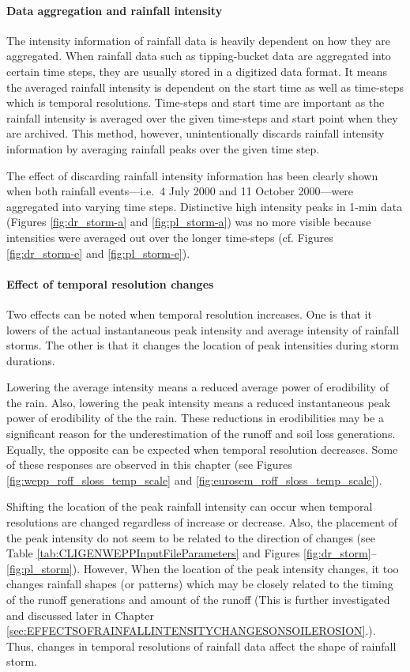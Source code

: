\paragraph{Data aggregation and rainfall intensity} The intensity information
of rainfall data is heavily dependent on how they are aggregated. When rainfall
data such as tipping-bucket data are aggregated into certain time steps, they
are usually stored in a digitized data format. It means the averaged rainfall
intensity is dependent on the start time as well as time-steps which is temporal
resolutions. Time-steps and start time are important as the rainfall intensity
is
averaged over the given time-steps and start point when they are archived. This
method, however, unintentionally discards rainfall intensity information by
averaging rainfall peaks over the given time step.

The effect of discarding rainfall intensity information has been clearly shown
when both rainfall events---i.e.\ 4 July 2000 and 11 October 2000---were
aggregated into varying time steps. Distinctive high intensity peaks in 1-min
data (Figures \ref{fig:dr_storm-a} and \ref{fig:pl_storm-a}) was no more visible
because intensities were averaged out over the longer time-steps (cf. Figures
\ref{fig:dr_storm-e} and \ref{fig:pl_storm-e}).

\paragraph{Effect of temporal resolution changes} Two effects can be noted when
temporal resolution increases. One is that it lowers of the actual instantaneous
peak
intensity and average intensity of rainfall storms. The other is that it
changes the location of peak intensities during storm durations.

Lowering the average intensity means a reduced average power of erodibility
of the rain. Also, lowering the peak intensity means a reduced instantaneous
peak power of erodibility of the the rain. These reductions in erodibilities may
be a significant reason for the underestimation of the runoff and soil loss
generations. Equally, the opposite can be expected when temporal resolution
decreases. Some of these responses are observed in this chapter (see Figures
\ref{fig:wepp_roff_sloss_temp_scale} and
\ref{fig:eurosem_roff_sloss_temp_scale}).

Shifting the location of the peak rainfall intensity can occur when temporal
resolutions are changed regardless of increase or decrease. Also, the placement
of
the peak intensity do not seem to be related to the direction of changes (see
Table \ref{tab:CLIGENWEPPInputFileParameters} and Figures
\ref{fig:dr_storm}--\ref{fig:pl_storm}). However, When the location of the peak
intensity changes, it too changes rainfall shapes (or patterns) which may be
closely related to the timing of the runoff generations and amount of the runoff
(This is further investigated and discussed later in Chapter
\ref{sec:EFFECTSOFRAINFALLINTENSITYCHANGESONSOILEROSION}.). Thus, changes in
temporal resolutions of rainfall data affect the shape of rainfall storm.

